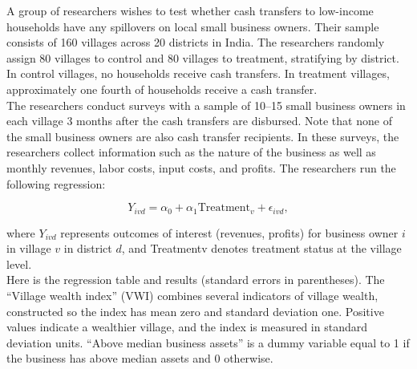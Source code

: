 \begin{homeworkProblem}
    
    A group of researchers wishes to test whether cash transfers to low-income 
    households have any spillovers on local small business owners. Their 
    sample consists of 160 villages across 20 districts in India. The 
    researchers randomly assign 80 villages to control and 80 villages to 
    treatment, stratifying by district. In control villages, no households 
    receive cash transfers. In treatment villages, approximately one fourth 
    of households receive a cash transfer. \\

    The researchers conduct surveys with a sample of 10–15 small business 
    owners in each village 3 months after the cash transfers are disbursed. 
    Note that none of the small business owners are also cash transfer 
    recipients. In these surveys, the researchers collect information such 
    as the nature of the business as well as monthly revenues, labor costs, 
    input costs, and profits. The researchers run the following regression:

    \[
        Y_{ivd} = \alpha_0 + \alpha_1 \text{Treatment}_{v} + \epsilon_{ivd},
    \]

    where $Y_{ivd}$ represents outcomes of interest (revenues, profits) for 
    business owner $i$ in village $v$ in district $d$, and Treatmentv denotes 
    treatment status at the village level. \\

    Here is the regression table and results (standard errors in parentheses). 
    The “Village wealth index” (VWI) combines several indicators of village 
    wealth, constructed so the index has mean zero and standard deviation one. 
    Positive values indicate a wealthier village, and the index is measured in 
    standard deviation units. “Above median business assets” is a dummy 
    variable equal to 1 if the business has above median assets and 0 
    otherwise.


\end{homeworkProblem}
